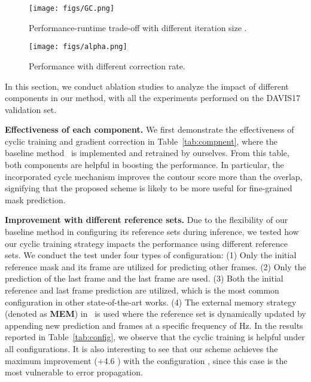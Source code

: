 \documentclass{article}
\begin{document}
\begin{figure}[t]
\vspace{-8mm}

    \begin{minipage}{0.5\linewidth}
        \texttt{[image: figs/GC.png]}
    \caption{Performance-runtime trade-off with different iteration size .}
    \label{fig:runtime}
    \end{minipage}
    \noindent
    \hspace{2mm}
    \begin{minipage}{0.45\linewidth}
        \texttt{[image: figs/alpha.png]}
    \caption{Performance with different correction rate.}
    \label{fig:alpha}
    \end{minipage}

\vspace{-5mm}
\end{figure}

In this section, we conduct ablation studies to analyze the impact of different components in our method, with all the experiments performed on the DAVIS17 validation set.

\textbf{Effectiveness of each component.} We first demonstrate the effectiveness of cyclic training and gradient correction in Table~\ref{tab:compnent}, where the baseline method~\cite{Oh_2019_ICCV} is implemented and retrained by ourselves. From this table, both components are helpful in boosting the performance. In particular, the incorporated cycle mechanism improves the contour score  more than the overlap, signifying that the proposed scheme is likely to be more useful for fine-grained mask prediction.

\textbf{Improvement with different reference sets.} Due to the flexibility of our baseline method in configuring its reference sets during inference, we tested how our cyclic training strategy impacts the performance using different reference sets. We conduct the test under four types of configuration: (1) Only the initial reference mask and its frame are utilized for predicting other frames. (2) Only the prediction of the last frame  and the last frame are used. (3) Both the initial reference and last frame prediction are utilized, which is the most common configuration in other state-of-the-art works. (4) The external memory strategy (denoted as \textbf{MEM}) in~\cite{Oh_2019_ICCV} is used where the reference set is dynamically updated by appending new prediction and frames at a specific frequency of Hz. In the results reported in Table~\ref{tab:config}, we observe that the cyclic training is helpful under all configurations. It is also interesting to see that our scheme achieves the maximum improvement (+4.6 ) with the configuration , since this case is the most vulnerable to error propagation.
\end{document}
